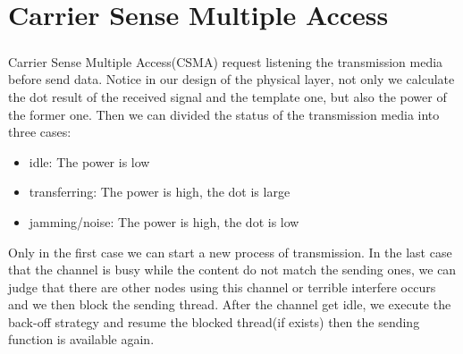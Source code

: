\section{Carrier Sense Multiple Access}
\subparagraph{}
Carrier Sense Multiple Access(CSMA) request listening the transmission media before send data. Notice in our design of the physical layer, not only we calculate the dot result of the received signal and the template one, but also the power of the former one. Then we can divided the status of the transmission media into three cases:
\begin{itemize}
    \item idle: The power is low
    \item transferring: The power is high, the dot is large
    \item jamming/noise: The power is high, the dot is low
\end{itemize}
Only in the first case we can start a new process of transmission. In the last case that the channel is busy while the content do not match the sending ones, we can judge that there are other nodes using this channel or terrible interfere occurs and we then block the sending thread. After the channel get idle, we execute the back-off strategy and resume the blocked thread(if exists) then the sending function is available again.